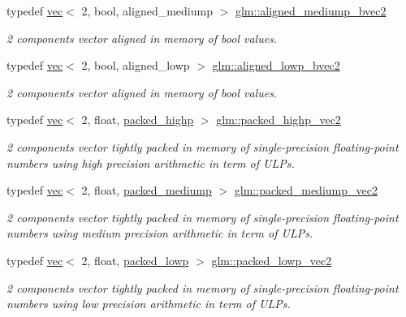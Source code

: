 \begin{DoxyCompactItemize}
typedef \hyperlink{structglm_1_1vec}{vec}$<$ 2, bool, aligned\+\_\+mediump $>$ \hyperlink{group__gtc__type__aligned_gae5c5d40c3d652a0f882f5f634914cfc9}{glm\+::aligned\+\_\+mediump\+\_\+bvec2}
\begin{DoxyCompactList}\small\item\em 2 components vector aligned in memory of bool values. \end{DoxyCompactList}\item 
typedef \hyperlink{structglm_1_1vec}{vec}$<$ 2, bool, aligned\+\_\+lowp $>$ \hyperlink{group__gtc__type__aligned_ga8118d4ac245590bb8c4dfcad9b7632ee}{glm\+::aligned\+\_\+lowp\+\_\+bvec2}
\begin{DoxyCompactList}\small\item\em 2 components vector aligned in memory of bool values. \end{DoxyCompactList}\item 
typedef \hyperlink{structglm_1_1vec}{vec}$<$ 2, float, \hyperlink{namespaceglm_a36ed105b07c7746804d7fdc7cc90ff25a8e8791ee77fe079b1291f710d88031bf}{packed\+\_\+highp} $>$ \hyperlink{group__gtc__type__aligned_ga15068ebf3dae2c205d90b1d36780bf9b}{glm\+::packed\+\_\+highp\+\_\+vec2}
\begin{DoxyCompactList}\small\item\em 2 components vector tightly packed in memory of single-\/precision floating-\/point numbers using high precision arithmetic in term of U\+L\+Ps. \end{DoxyCompactList}\item 
typedef \hyperlink{structglm_1_1vec}{vec}$<$ 2, float, \hyperlink{namespaceglm_a36ed105b07c7746804d7fdc7cc90ff25a9604654c3b137cd7898689fd34b25bc0}{packed\+\_\+mediump} $>$ \hyperlink{group__gtc__type__aligned_ga16f6a2ad499160b96c263f7f216a70e2}{glm\+::packed\+\_\+mediump\+\_\+vec2}
\begin{DoxyCompactList}\small\item\em 2 components vector tightly packed in memory of single-\/precision floating-\/point numbers using medium precision arithmetic in term of U\+L\+Ps. \end{DoxyCompactList}\item 
typedef \hyperlink{structglm_1_1vec}{vec}$<$ 2, float, \hyperlink{namespaceglm_a36ed105b07c7746804d7fdc7cc90ff25ac36a4bd74559be2c0b65bc48e5953b8b}{packed\+\_\+lowp} $>$ \hyperlink{group__gtc__type__aligned_ga5457fdfd08276277a86cb27e1da6aa9c}{glm\+::packed\+\_\+lowp\+\_\+vec2}
\begin{DoxyCompactList}\small\item\em 2 components vector tightly packed in memory of single-\/precision floating-\/point numbers using low precision arithmetic in term of U\+L\+Ps. \end{DoxyCompactList}\item 

\end{DoxyCompactItemize}
